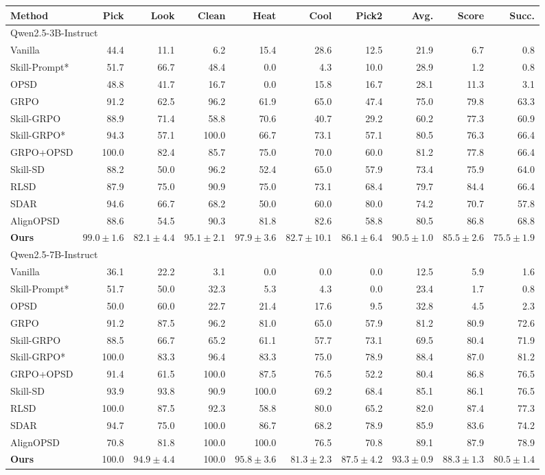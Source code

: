\begin{tabular}{lrrrrrrrrr}
\toprule
Method & Pick & Look & Clean & Heat & Cool & Pick2 & Avg. & Score & Succ. \\
\midrule
\multicolumn{10}{l}{Qwen2.5-3B-Instruct} \\
Vanilla & 44.4 & 11.1 & 6.2 & 15.4 & 28.6 & 12.5 & 21.9 & 6.7 & 0.8 \\
Skill-Prompt* & 51.7 & 66.7 & 48.4 & 0.0 & 4.3 & 10.0 & 28.9 & 1.2 & 0.8 \\
OPSD & 48.8 & 41.7 & 16.7 & 0.0 & 15.8 & 16.7 & 28.1 & 11.3 & 3.1 \\
GRPO & 91.2 & 62.5 & 96.2 & 61.9 & 65.0 & 47.4 & 75.0 & 79.8 & 63.3 \\
Skill-GRPO & 88.9 & 71.4 & 58.8 & 70.6 & 40.7 & 29.2 & 60.2 & 77.3 & 60.9 \\
Skill-GRPO* & 94.3 & 57.1 & 100.0 & 66.7 & 73.1 & 57.1 & 80.5 & 76.3 & 66.4 \\
GRPO+OPSD & 100.0 & 82.4 & 85.7 & 75.0 & 70.0 & 60.0 & 81.2 & 77.8 & 66.4 \\
Skill-SD & 88.2 & 50.0 & 96.2 & 52.4 & 65.0 & 57.9 & 73.4 & 75.9 & 64.0 \\
RLSD & 87.9 & 75.0 & 90.9 & 75.0 & 73.1 & 68.4 & 79.7 & 84.4 & 66.4 \\
SDAR & 94.6 & 66.7 & 68.2 & 50.0 & 60.0 & 80.0 & 74.2 & 70.7 & 57.8 \\
AlignOPSD & 88.6 & 54.5 & 90.3 & 81.8 & 82.6 & 58.8 & 80.5 & 86.8 & 68.8 \\
\textbf{Ours} & $99.0\pm1.6$ & $82.1\pm4.4$ & $95.1\pm2.1$ & $97.9\pm3.6$ & $82.7\pm10.1$ & $86.1\pm6.4$ & $90.5\pm1.0$ & $85.5\pm2.6$ & $75.5\pm1.9$ \\
\midrule
\multicolumn{10}{l}{Qwen2.5-7B-Instruct} \\
Vanilla & 36.1 & 22.2 & 3.1 & 0.0 & 0.0 & 0.0 & 12.5 & 5.9 & 1.6 \\
Skill-Prompt* & 51.7 & 50.0 & 32.3 & 5.3 & 4.3 & 0.0 & 23.4 & 1.7 & 0.8 \\
OPSD & 50.0 & 60.0 & 22.7 & 21.4 & 17.6 & 9.5 & 32.8 & 4.5 & 2.3 \\
GRPO & 91.2 & 87.5 & 96.2 & 81.0 & 65.0 & 57.9 & 81.2 & 80.9 & 72.6 \\
Skill-GRPO & 88.5 & 66.7 & 65.2 & 61.1 & 57.7 & 73.1 & 69.5 & 80.4 & 71.9 \\
Skill-GRPO* & 100.0 & 83.3 & 96.4 & 83.3 & 75.0 & 78.9 & 88.4 & 87.0 & 81.2 \\
GRPO+OPSD & 91.4 & 61.5 & 100.0 & 87.5 & 76.5 & 52.2 & 80.4 & 86.8 & 76.5 \\
Skill-SD & 93.9 & 93.8 & 90.9 & 100.0 & 69.2 & 68.4 & 85.1 & 86.1 & 76.5 \\
RLSD & 100.0 & 87.5 & 92.3 & 58.8 & 80.0 & 65.2 & 82.0 & 87.4 & 77.3 \\
SDAR & 94.7 & 75.0 & 100.0 & 86.7 & 68.2 & 78.9 & 85.9 & 83.6 & 74.2 \\
AlignOPSD & 70.8 & 81.8 & 100.0 & 100.0 & 76.5 & 70.8 & 89.1 & 87.9 & 78.9 \\
\textbf{Ours} & 100.0 & $94.9\pm4.4$ & 100.0 & $95.8\pm3.6$ & $81.3\pm2.3$ & $87.5\pm4.2$ & $93.3\pm0.9$ & $88.3\pm1.3$ & $80.5\pm1.4$ \\
\bottomrule
\end{tabular}
